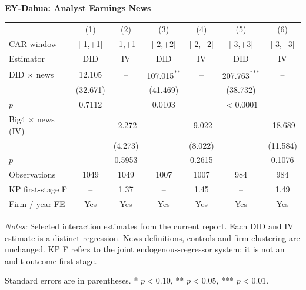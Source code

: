 \documentclass[10pt]{article}
\newcommand{\sym}[1]{\textsuperscript{#1}}
\begin{document}
\begin{minipage}{23.60cm}
\fontsize{10}{12}\selectfont
\setlength{\tabcolsep}{4pt}\renewcommand{\arraystretch}{1.08}
{\large\bfseries EY-Dahua: Analyst Earnings News}\par\medskip
\begin{tabular*}{\linewidth}{@{\extracolsep{\fill}}lcccccc@{}}
\toprule
 & (1) & (2) & (3) & (4) & (5) & (6) \\
CAR window & [-1,+1] & [-1,+1] & [-2,+2] & [-2,+2] & [-3,+3] & [-3,+3] \\
Estimator & DID & IV & DID & IV & DID & IV \\
\midrule
DID $\times$ news & 12.105 & -- & 107.015\sym{**} & -- & 207.763\sym{***} & -- \\
 & (32.671) &  & (41.469) &  & (38.732) &  \\
$p$ & 0.7112 &  & 0.0103 &  & $<0.0001$ &  \\
Big4 $\times$ news (IV) & -- & -2.272 & -- & -9.022 & -- & -18.689 \\
 &  & (4.273) &  & (8.022) &  & (11.584) \\
$p$ &  & 0.5953 &  & 0.2615 &  & 0.1076 \\
\midrule
Observations & 1049 & 1049 & 1007 & 1007 & 984 & 984 \\
KP first-stage F & -- & 1.37 & -- & 1.45 & -- & 1.49 \\
Firm / year FE & Yes & Yes & Yes & Yes & Yes & Yes \\
\bottomrule\end{tabular*}\par\medskip
\fontsize{9}{11}\selectfont\textit{Notes:} Selected interaction estimates from the current report. Each DID and IV estimate is a distinct regression. News definitions, controls and firm clustering are unchanged. KP F refers to the joint endogenous-regressor system; it is not an audit-outcome first stage.
\par Standard errors are in parentheses. * $p<0.10$, ** $p<0.05$, *** $p<0.01$.
\end{minipage}
\end{document}
